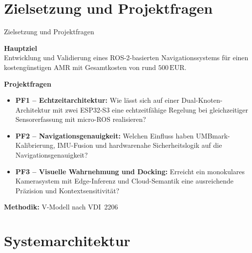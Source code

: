 \documentclass[aspectratio=169]{beamer}
\begin{document}
\section{Zielsetzung und Projektfragen}

\begin{frame}{Zielsetzung und Projektfragen}

  \textbf{Hauptziel}\\
  Entwicklung und Validierung eines ROS-2-basierten Navigationssystems
  für einen kostengünstigen AMR mit Gesamtkosten von rund
  $500\,\mathrm{EUR}$.

  \vspace{0.5em}
  \textbf{Projektfragen}
  \begin{itemize}
    \item \textbf{PF1 -- Echtzeitarchitektur:} Wie lässt sich auf einer
          Dual-Knoten-Architektur mit zwei ESP32-S3 eine echtzeitfähige
          Regelung bei gleichzeitiger Sensorerfassung mit micro-ROS
          realisieren?
    \item \textbf{PF2 -- Navigationsgenauigkeit:} Welchen Einfluss haben
          UMBmark-Kalibrierung, IMU-Fusion und hardwarenahe
          Sicherheitslogik auf die Navigationsgenauigkeit?
    \item \textbf{PF3 -- Visuelle Wahrnehmung und Docking:} Erreicht ein
          monokulares Kamerasystem mit Edge-Inferenz und Cloud-Semantik
          eine ausreichende Präzision und Kontextsensitivität?
  \end{itemize}

  \vspace{0.3em}
  \textbf{Methodik:} V-Modell nach VDI~2206

\end{frame}

\section{Systemarchitektur}
\end{document}
